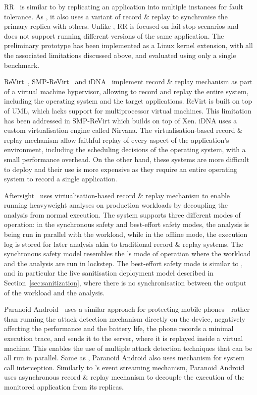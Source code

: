 RR~\cite{rr} is similar to \varan by replicating an application into multiple
instances for fault tolerance. As \varan, it also uses a variant of
record \& replay to synchronise the primary replica with others. Unlike \varan, RR
is focused on fail-stop scenarios and does not support running different
versions of the same application. The preliminary prototype has been
implemented as a Linux kernel extension, with all the associated limitations
discussed above, and evaluated using only a single benchmark.

ReVirt~\cite{revirt}, SMP-ReVirt~\cite{smp-revirt} and iDNA~\cite{idna}
implement record \& replay mechanism as part of a virtual machine hypervisor,
allowing to record and replay the entire system, including the operating system
and the target applications. ReVirt is built on top of UML, which lacks support
for multiprocessor virtual machines. This limitation has been addressed in
SMP-ReVirt which builds on top of Xen. iDNA uses a custom virtualisation engine
called Nirvana. The virtualisation-based record \& replay mechanism allow faithful
replay of every aspect of the application's environment, including the
scheduling decisions of the operating system, with a small performance
overhead.  On the other hand, these systems are more difficult to deploy and
their use is more expensive as they require an entire operating system to
record a single application.

Aftersight~\cite{aftersight} uses virtualisation-based record \&
replay mechanism to enable running heavyweight analyses on production workloads
by decoupling the analysis from normal execution. The system supports three
different modes of operation: in the synchronous safety and best-effort safety
modes, the analysis is being run in parallel with the workload, while in the
offline mode, the execution log is stored for later analysis akin to
traditional record \& replay systems. The synchronous safety model resembles
the \mx's mode of operation where the workload and the analysis are run in
lockstep.  The best-effort safety mode is similar to \varan, and in particular
the live sanitisation deployment model described in
Section~\ref{sec:sanitization}, where there is no synchronisation between the
output of the workload and the analysis.

Paranoid Android~\cite{paranoid-android} uses a similar approach
for protecting mobile phones---rather than running the attack detection
mechanism directly on the device, negatively affecting the performance and the
battery life, the phone records a minimal execution trace, and sends it to the
server, where it is replayed inside a virtual machine. This enables the use of
multiple attack detection techniques that can be all run in parallel. Same as
\mx, Paranoid Android also uses \ptrace mechanism for system call interception.
Similarly to \varan's event streaming mechanism, Paranoid Android uses
asynchronous record \& replay mechanism to decouple the execution of the
monitored application from its replicas.


